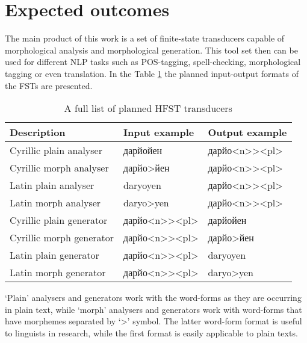 \section{Expected outcomes}
\par The main product of this work is a set of finite-state transducers capable of morphological analysis and morphological generation. This tool set then can be used for different NLP tasks such as POS-tagging, spell-checking, morphological tagging or even translation. In the Table \hyperref[Tab:format]{1} the planned input-output formats of the FSTs are presented.
\begin{table}[!h]
    \begin{center}
        \begin{tabular}{|l|l|l|} 
            \hline
            Description & Input example & Output example \\
            \hline
            \hline
            Cyrillic plain analyser & дарйойен & дарйо<n>{}><pl> \\
            \hline
            Cyrillic morph analyser & дарйо>йен & дарйо<n>{}><pl> \\
            \hline
            Latin plain analyser & daryoyen & дарйо<n>{}><pl> \\
            \hline
            Latin morph analyser & daryo>yen & дарйо<n>{}><pl> \\
            \hline
            Cyrillic plain generator & дарйо<n>{}><pl> & дарйойен \\
            \hline
            Cyrillic morph generator & дарйо<n>{}><pl> & дарйо>йен \\
            \hline
            Latin plain generator & дарйо<n>{}><pl> & daryoyen \\
            \hline
            Latin morph generator & дарйо<n>{}><pl> & daryo>yen \\
            \hline
        \end{tabular}
        \label{Tab:format}
        \caption{A full list of planned HFST transducers}
    \end{center}
\end{table}
`Plain' analysers and generators work with the word-forms as they are occurring in plain text, while `morph' analysers and generators work with word-forms that have morphemes separated by `>' symbol. The latter word-form format is useful to linguists in research, while the first format is easily applicable to plain texts.
